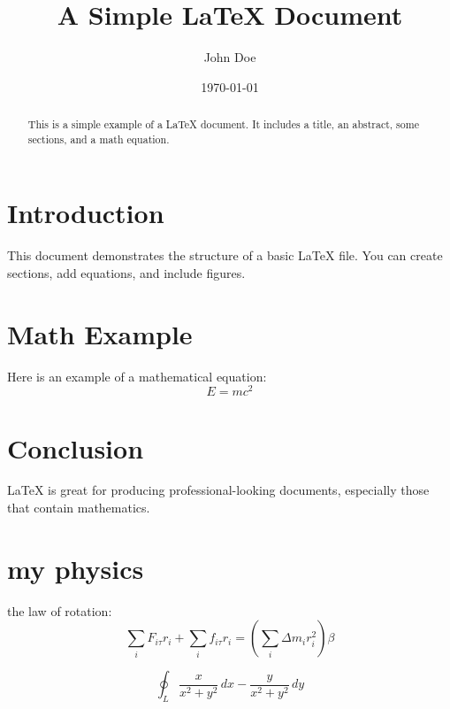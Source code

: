 \documentclass[12pt]{article}
\title{A Simple \LaTeX{} Document}
\author{John Doe}
\date{\today}
\begin{document}
\maketitle

\begin{abstract}
    This is a simple example of a \LaTeX{} document.
It includes a title, an abstract, some sections, and a math equation.
\end{abstract}

\section{Introduction}
    This document demonstrates the structure of a basic LaTeX file. You can create sections, add equations, and include figures.

\section{Math Example}
    Here is an example of a mathematical equation:
\[
E = mc^2
\]

\section{Conclusion}
LaTeX is great for producing professional-looking documents, especially those that contain mathematics.

\section{my physics}
    the law of rotation:
\begin{equation}
    \sum_i F_{i\tau}  r_i + \sum_i f_{i\tau}   r_i = \left( \sum_i \Delta m_i r_i^2 \right) \beta
\end{equation}

\begin{equation}
    \oint_L \frac{x}{x^2 + y^2} \, dx -\frac{y}{x^2 + y^2} \, dy
\end{equation}
\end{document}
